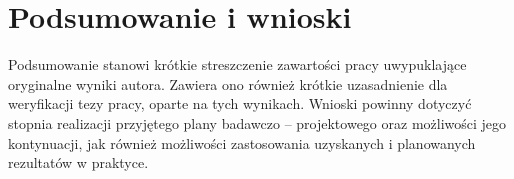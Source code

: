 \section{Podsumowanie i wnioski}
\label{sec:podsumowanie-wnioski}
Podsumowanie stanowi krótkie streszczenie zawartości pracy uwypuklające oryginalne wyniki autora. Zawiera ono również krótkie uzasadnienie dla weryfikacji tezy pracy, oparte na tych wynikach. Wnioski powinny dotyczyć stopnia realizacji przyjętego plany badawczo – projektowego oraz możliwości jego kontynuacji, jak również możliwości zastosowania uzyskanych i planowanych rezultatów w praktyce.


